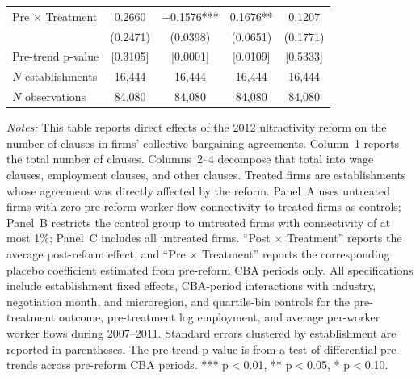 \begin{table}[!htbp]
\begin{tabular}{lcccc}
Pre $\times$ Treatment & 0.2660 & $-$0.1576*** & 0.1676** & 0.1207\\
 & (0.2471) & (0.0398) & (0.0651) & (0.1771)\\
Pre-trend p-value & [0.3105] & [0.0001] & [0.0109] & [0.5333]\\
$N$ establishments & 16{,}444 & 16{,}444 & 16{,}444 & 16{,}444\\
$N$ observations & 84{,}080 & 84{,}080 & 84{,}080 & 84{,}080\\
\bottomrule
\end{tabular}
\begin{minipage}{\linewidth}
\footnotesize\vspace{4pt}
\textit{Notes:} This table reports direct effects of the 2012 ultractivity reform on the number of clauses in firms' collective bargaining agreements. Column~1 reports the total number of clauses. Columns~2--4 decompose that total into wage clauses, employment clauses, and other clauses. Treated firms are establishments whose agreement was directly affected by the reform. Panel~A uses untreated firms with zero pre-reform worker-flow connectivity to treated firms as controls; Panel~B restricts the control group to untreated firms with connectivity of at most 1\%; Panel~C includes all untreated firms. ``Post $\times$ Treatment'' reports the average post-reform effect, and ``Pre $\times$ Treatment'' reports the corresponding placebo coefficient estimated from pre-reform CBA periods only. All specifications include establishment fixed effects, CBA-period interactions with industry, negotiation month, and microregion, and quartile-bin controls for the pre-treatment outcome, pre-treatment log employment, and average per-worker worker flows during 2007--2011. Standard errors clustered by establishment are reported in parentheses. The pre-trend p-value is from a test of differential pre-trends across pre-reform CBA periods. *** p$<$0.01, ** p$<$0.05, * p$<$0.10.
\end{minipage}
\end{table}
